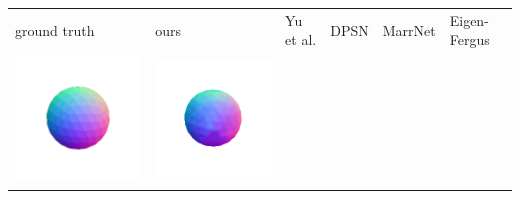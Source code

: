 \begin{tabularx}{\linewidth}{@{}Y@{}Y@{}Y@{}Y@{}Y@{}Y@{}}
ground truth & ours & Yu et al. & DPSN & MarrNet & Eigen-Fergus \\
\includegraphics[width=\linewidth]{semisynthetic/20150514_1_gt.png} &
\includegraphics[width=\linewidth]{semisynthetic/20150514_1_ours_out.png} &

\end{tabularx}
